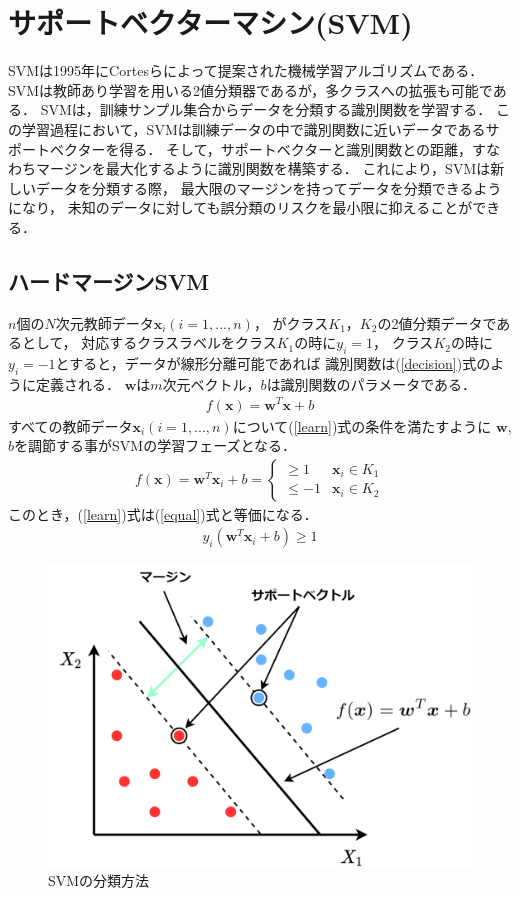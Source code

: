 \section{サポートベクターマシン(SVM)}
SVMは1995年にCortesらによって提案された機械学習アルゴリズムである\cite{svm}．
SVMは教師あり学習を用いる2値分類器であるが，多クラスへの拡張も可能である．
SVMは，訓練サンプル集合からデータを分類する識別関数を学習する．
この学習過程において，SVMは訓練データの中で識別関数に近いデータであるサポートベクターを得る．
そして，サポートベクターと識別関数との距離，すなわちマージンを最大化するように識別関数を構築する．
これにより，SVMは新しいデータを分類する際，
最大限のマージンを持ってデータを分類できるようになり，
未知のデータに対しても誤分類のリスクを最小限に抑えることができる．
\subsection{ハードマージンSVM}
$n$個の$N$次元教師データ$\boldsymbol{x}_i(i=1,...,n)$，
がクラス$K_1$，$K_2$の2値分類データであるとして，
対応するクラスラベルをクラス$K_1$の時に$y_i= 1$，
クラス$K_2$の時に$y_i= -1$とすると，データが線形分離可能であれば
識別関数は(\ref{decision})式のように定義される．
 $\boldsymbol{w}$は$m$次元ベクトル，$b$は識別関数のパラメータである．
\begin{align}
    \label{decision}
f(\boldsymbol{x}) = \boldsymbol{w}^T \boldsymbol{x} + b
\end{align}
すべての教師データ$\boldsymbol{x}_i(i=1,...,n)$について(\ref{learn})式の条件を満たすように
$\boldsymbol{w}$, $b$を調節する事がSVMの学習フェーズとなる．
\begin{align}
    \label{learn}
    f(\boldsymbol{x}) = \boldsymbol{w}^T \boldsymbol{x}_i + b =
    \begin{cases}
        \geq 1&  \boldsymbol{x}_i \in K_1 \\
        \leq  -1& \boldsymbol{x}_i \in K_2
    \end{cases}
\end{align}
このとき，(\ref{learn})式は(\ref{equal})式と等価になる．
\begin{align}
    \label{equal}
    y_i(\boldsymbol{w}^T \boldsymbol{x}_i + b) \geq 1
\end{align}
\begin{figure}
    \centering
    \includegraphics[width=0.6\linewidth]{svm_support.png}
    \caption{SVMの分類方法}
    \label{svm_support}
\end{figure}
